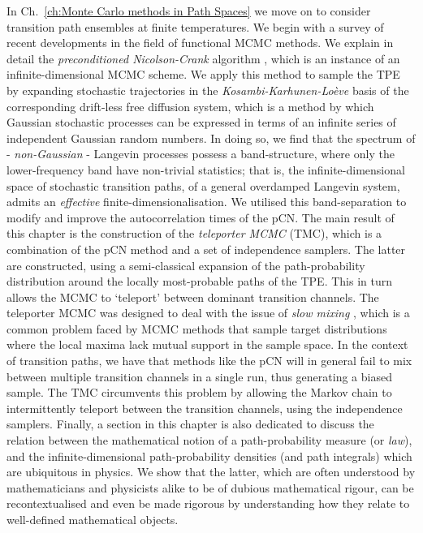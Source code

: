 \documentclass[]{cam-thesis}
\begin{document}
In Ch.~\ref{ch:Monte Carlo methods in Path Spaces} we move on to consider transition path ensembles at finite temperatures. We begin with a survey of recent developments in the field of functional MCMC methods. We explain in detail the \textit{preconditioned Nicolson-Crank} algorithm \citep{cotterMCMCMethodsFunctions2013a, beskosMCMCMETHODSDIFFUSION2008a, hairerAnalysisSPDEsArising2005a, hairerAnalysisSPDEsArising2007a, hairerSpectralGapsMetropolis2014a}, which is an instance of an infinite-dimensional MCMC scheme. We apply this method to sample the TPE by expanding stochastic trajectories in the \textit{Kosambi-Karhunen-Lo\`eve} basis \citep{kosambiParallelismPathspaces2016, karhunenUeberLineareMethoden1947, loeveProbabilityTheory1977a} of the corresponding drift-less free diffusion system, which is a method by which Gaussian stochastic processes can be expressed in terms of an infinite series of independent Gaussian random numbers. In doing so, we find that the spectrum of - \textit{non-Gaussian} - Langevin processes possess a band-structure, where only the lower-frequency band have non-trivial statistics; that is, the infinite-dimensional space of stochastic transition paths, of a general overdamped Langevin system, admits an \textit{effective} finite-dimensionalisation. We utilised this band-separation to modify and improve the autocorrelation times of the pCN. The main result of this chapter is the construction of the \textit{teleporter MCMC} (TMC), which is a combination of the pCN method and a set of independence samplers. The latter are constructed, using a semi-classical expansion of the path-probability distribution around the locally most-probable paths of the TPE. This in turn allows the MCMC to `teleport' between dominant transition channels. The teleporter MCMC was designed to deal with the issue of \textit{slow mixing} \citep{holdenMixingMCMCAlgorithms2019}, which is a common problem faced by MCMC methods that sample target distributions where the local maxima lack mutual support in the sample space. In the context of transition paths, we have that methods like the pCN will in general fail to mix between multiple transition channels in a single run, thus generating a biased sample. The TMC circumvents this problem by allowing the Markov chain to intermittently teleport between the transition channels, using the independence samplers. Finally, a section in this chapter is also dedicated to discuss the relation between the mathematical notion of a path-probability measure (or \textit{law}), and the infinite-dimensional path-probability densities (and path integrals) which are ubiquitous in physics. We show that the latter, which are often understood by mathematicians and physicists alike to be of dubious mathematical rigour, can be recontextualised and even be made rigorous by understanding how they relate to well-defined mathematical objects.
\end{document}
